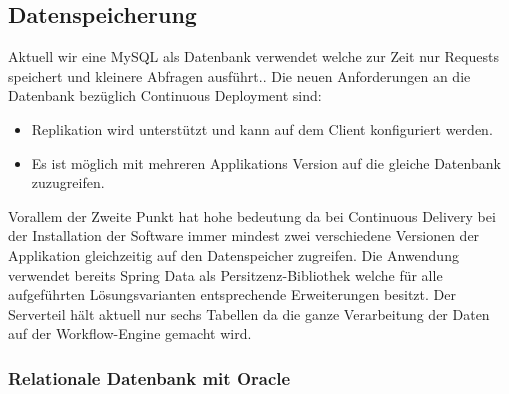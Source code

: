 \subsection{Datenspeicherung}
\label{ent-db}
Aktuell wir eine MySQL als Datenbank verwendet welche zur Zeit nur Requests speichert und kleinere Abfragen ausführt.. Die neuen Anforderungen an die Datenbank bezüglich Continuous Deployment sind:
\begin{itemize}
	\item Replikation wird unterstützt und kann auf dem Client konfiguriert werden.
	\item Es ist möglich mit mehreren Applikations Version auf die gleiche Datenbank zuzugreifen.
\end{itemize}
Vorallem der Zweite Punkt hat hohe bedeutung da bei Continuous Delivery bei der Installation der Software immer mindest zwei verschiedene Versionen der Applikation gleichzeitig auf den Datenspeicher zugreifen. Die Anwendung verwendet bereits Spring Data als Persitzenz-Bibliothek welche für alle aufgeführten Lösungsvarianten entsprechende Erweiterungen besitzt. Der Serverteil hält aktuell nur sechs Tabellen da die ganze Verarbeitung der Daten auf der Workflow-Engine gemacht wird.

\subsubsection{Relationale Datenbank mit Oracle}

